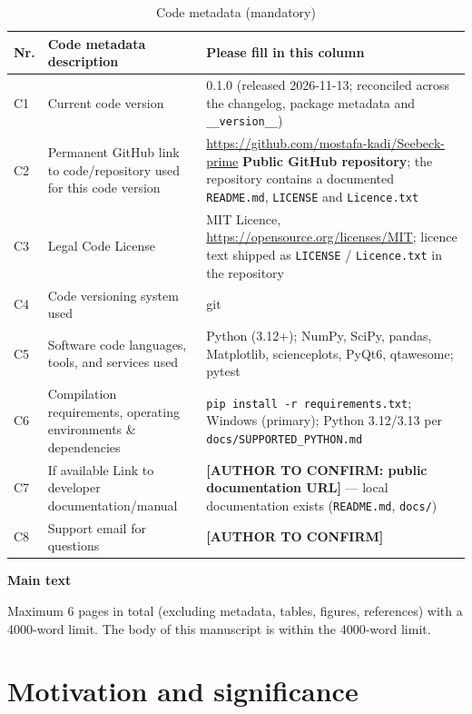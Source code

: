 \documentclass[preprint,12pt, a4paper]{elsarticle}
\begin{document}
\begin{table}[!h]
\begin{tabular}{|l|p{6.5cm}|p{6.5cm}|}
\hline
\textbf{Nr.} & \textbf{Code metadata description} & \textbf{Please fill in this column} \\
\hline
C1 & Current code version & 0.1.0 (released 2026-11-13; reconciled across the changelog, package metadata and \texttt{\_\_version\_\_}) \\
\hline
C2 & Permanent GitHub link to code/repository used for this code version & \url{https://github.com/mostafa-kadi/Seebeck-prime} \textbf{Public GitHub repository}; the repository contains a documented \texttt{README.md}, \texttt{LICENSE} and \texttt{Licence.txt} \\
\hline
C3 & Legal Code License & MIT Licence, \url{https://opensource.org/licenses/MIT}; licence text shipped as \texttt{LICENSE} / \texttt{Licence.txt} in the repository \\
\hline
C4 & Code versioning system used & git \\
\hline
C5 & Software code languages, tools, and services used & Python (3.12+); NumPy, SciPy, pandas, Matplotlib, scienceplots, PyQt6, qtawesome; pytest \\
\hline
C6 & Compilation requirements, operating environments \& dependencies & \texttt{pip install -r requirements.txt}; Windows (primary); Python 3.12/3.13 per \texttt{docs/SUPPORTED\_PYTHON.md} \\
\hline
C7 & If available Link to developer documentation/manual & \textbf{[AUTHOR TO CONFIRM: public documentation URL]} --- local documentation exists (\texttt{README.md}, \texttt{docs/}) \\
\hline
C8 & Support email for questions & \textbf{[AUTHOR TO CONFIRM]} \\
\hline
\end{tabular}
\caption{Code metadata (mandatory)}
\label{}
\end{table}

\textbf{Main text}

Maximum 6 pages in total (excluding metadata, tables, figures, references) with
a 4000-word limit. The body of this manuscript is within the 4000-word limit.


\section{Motivation and significance}
\label{sec:motivation}
\end{document}
